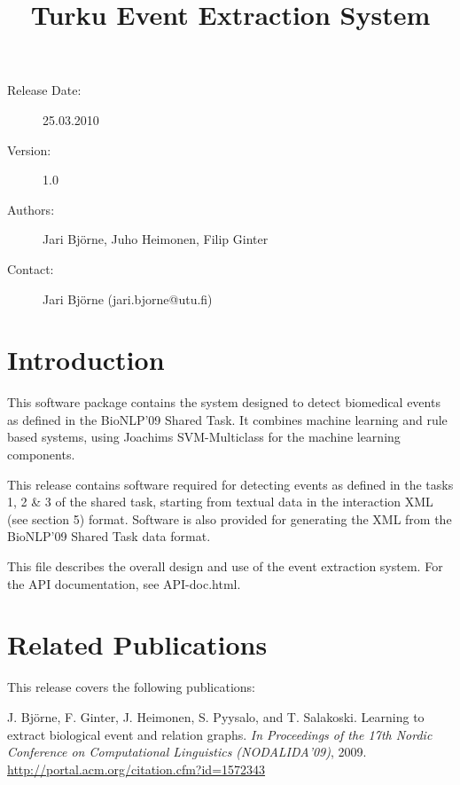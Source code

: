 \documentclass[a4paper,12pt]{article}
\title{\vspace{-4cm}Turku Event Extraction System\\}
\author{}
\date{}
\begin{document}
\maketitle

\vspace{-2cm}\begin{description}
\item[Release Date:] 25.03.2010
\item[Version:] 1.0
\item[Authors:] Jari Bj{\"{o}}rne, Juho Heimonen, Filip Ginter
\item[Contact:] Jari Bj{\"{o}}rne (jari.bjorne@utu.fi)
\end{description}

\tableofcontents

\section{Introduction}

This software package contains the system designed to detect biomedical events as
defined in the BioNLP'09 Shared Task. It combines machine learning and rule based
systems, using Joachims SVM-Multiclass for the machine learning components.

This release contains software required for detecting events as
defined in the tasks 1, 2 \& 3 of the shared task, starting from textual data in
the interaction XML (see section 5) format. Software is also provided for
generating the XML from the BioNLP'09 Shared Task data format.

This file describes the overall design and use of the event extraction system.
For the API documentation, see API-doc.html.

\section{Related Publications}

This release covers the following publications:

\vspace{5 mm}

J. Bj{\"{o}}rne, F. Ginter, J. Heimonen, S. Pyysalo, and T. Salakoski. Learning to
extract biological event and relation graphs. \emph{In Proceedings of the 17th
Nordic Conference on Computational Linguistics (NODALIDA’09)}, 2009.
\url{http://portal.acm.org/citation.cfm?id=1572343}
\end{document}
